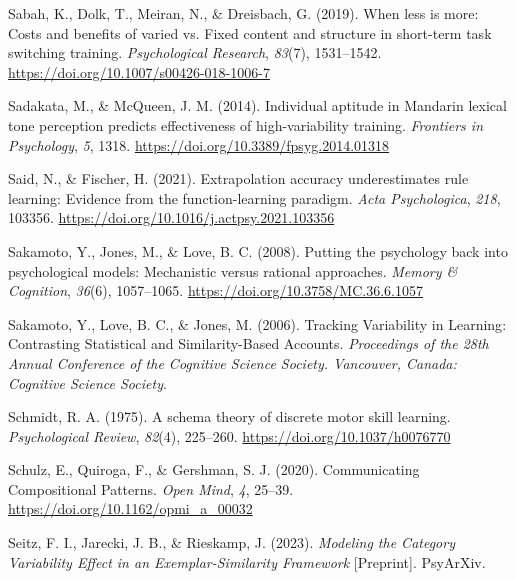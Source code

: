 \documentclass[
  11pt,
  letterpaper,
]{article}
\newlength{\cslhangindent}
\newenvironment{CSLReferences}[2] %
 {\begin{list}{}{%
  \setlength{\itemindent}{0pt}
  \setlength{\leftmargin}{0pt}
  \setlength{\parsep}{0pt}
  \ifodd #1
   \setlength{\leftmargin}{\cslhangindent}
   \setlength{\itemindent}{-1\cslhangindent}
  \fi
  \setlength{\itemsep}{#2\baselineskip}}}
 {\end{list}}
\begin{document}
\begin{CSLReferences}{1}{0}
Sabah, K., Dolk, T., Meiran, N., \& Dreisbach, G. (2019). When less is
more: Costs and benefits of varied vs. Fixed content and structure in
short-term task switching training. \emph{Psychological Research},
\emph{83}(7), 1531--1542.
\url{https://doi.org/10.1007/s00426-018-1006-7}

Sadakata, M., \& McQueen, J. M. (2014). Individual aptitude in
{Mandarin} lexical tone perception predicts effectiveness of
high-variability training. \emph{Frontiers in Psychology}, \emph{5},
1318. \url{https://doi.org/10.3389/fpsyg.2014.01318}

Said, N., \& Fischer, H. (2021). Extrapolation accuracy underestimates
rule learning: {Evidence} from the function-learning paradigm.
\emph{Acta Psychologica}, \emph{218}, 103356.
\url{https://doi.org/10.1016/j.actpsy.2021.103356}

Sakamoto, Y., Jones, M., \& Love, B. C. (2008). Putting the psychology
back into psychological models: {Mechanistic} versus rational
approaches. \emph{Memory \& Cognition}, \emph{36}(6), 1057--1065.
\url{https://doi.org/10.3758/MC.36.6.1057}

Sakamoto, Y., Love, B. C., \& Jones, M. (2006). Tracking {Variability}
in {Learning}: {Contrasting Statistical} and {Similarity-Based
Accounts}. \emph{Proceedings of the 28th Annual Conference of the
Cognitive Science Society. Vancouver, Canada: Cognitive Science
Society}.

Schmidt, R. A. (1975). A schema theory of discrete motor skill learning.
\emph{Psychological Review}, \emph{82}(4), 225--260.
\url{https://doi.org/10.1037/h0076770}

Schulz, E., Quiroga, F., \& Gershman, S. J. (2020). Communicating
{Compositional Patterns}. \emph{Open Mind}, \emph{4}, 25--39.
\url{https://doi.org/10.1162/opmi_a_00032}

Seitz, F. I., Jarecki, J. B., \& Rieskamp, J. (2023). \emph{Modeling the
{Category Variability Effect} in an {Exemplar-Similarity Framework}}
{[}Preprint{]}. PsyArXiv.


\end{CSLReferences}
\end{document}
